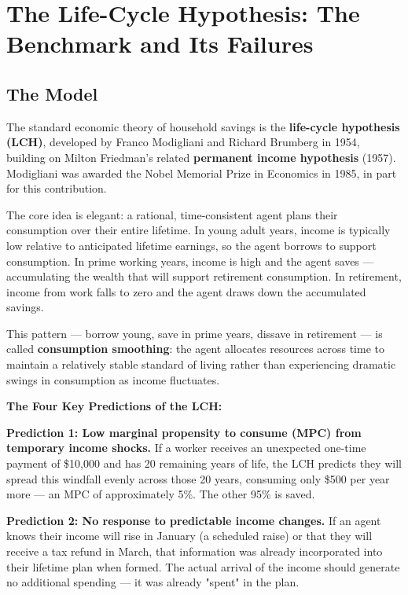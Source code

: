 \documentclass[12pt, letterpaper]{article}
\begin{document}
\medskip


\section{The Life-Cycle Hypothesis: The Benchmark and Its Failures}



\subsection{The Model}


The standard economic theory of household savings is the \textbf{life-cycle hypothesis (LCH)}, developed by Franco Modigliani and Richard Brumberg in 1954, building on Milton Friedman's related \textbf{permanent income hypothesis} (1957). Modigliani was awarded the Nobel Memorial Prize in Economics in 1985, in part for this contribution.

The core idea is elegant: a rational, time-consistent agent plans their consumption over their entire lifetime. In young adult years, income is typically low relative to anticipated lifetime earnings, so the agent borrows to support consumption. In prime working years, income is high and the agent saves --- accumulating the wealth that will support retirement consumption. In retirement, income from work falls to zero and the agent draws down the accumulated savings.

This pattern --- borrow young, save in prime years, dissave in retirement --- is called \textbf{consumption smoothing}: the agent allocates resources across time to maintain a relatively stable standard of living rather than experiencing dramatic swings in consumption as income fluctuates.

\textbf{The Four Key Predictions of the LCH:}

\textbf{Prediction 1: Low marginal propensity to consume (MPC) from temporary income shocks.} If a worker receives an unexpected one-time payment of \$10,000 and has 20 remaining years of life, the LCH predicts they will spread this windfall evenly across those 20 years, consuming only \$500 per year more --- an MPC of approximately 5\%. The other 95\% is saved.

\textbf{Prediction 2: No response to predictable income changes.} If an agent knows their income will rise in January (a scheduled raise) or that they will receive a tax refund in March, that information was already incorporated into their lifetime plan when formed. The actual arrival of the income should generate no additional spending --- it was already "spent" in the plan.
\end{document}
